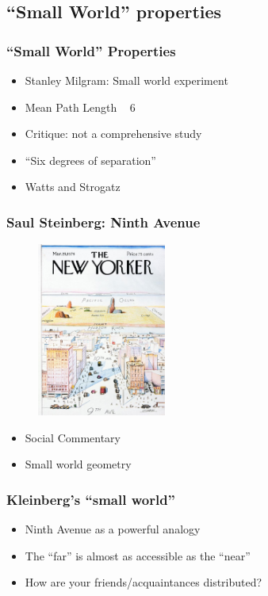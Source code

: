 \documentclass{beamer}
\begin{document}
	\subsection{``Small World'' properties}
		\frame
		{
			\frametitle{``Small World'' Properties}
				\begin{itemize}
					\item<1-> {Stanley Milgram: Small world experiment}
					\item<2-> {Mean Path Length ~ 6}
					\item<3-> {Critique: not a comprehensive study}
					\item<4-> {``Six degrees of separation''}
					\item<5-> {Watts and Strogatz}
				\end{itemize}
		}
		\frame
		{
			\frametitle{Saul Steinberg: Ninth Avenue}
			\begin{centering}			
			\begin{figure}
				\includegraphics[height=2.25in]{newyorker2.jpg}
			\end{figure}
			\end{centering}					
		}
		\frame
		{
			\begin{itemize}
				\item<1-> {Social Commentary}
				\item<2-> {Small world geometry}
			\end{itemize}
		}
		
		\frame	
		{
			\frametitle{Kleinberg's ``small world''}
				\begin{itemize}
					\item<1-> {Ninth Avenue as a powerful analogy}
					\item<2-> {The ``far'' is almost as accessible as the ``near''}
					\item<3-> {How are your friends/acquaintances distributed?}	
				\end{itemize}
		}
		
\end{document}

